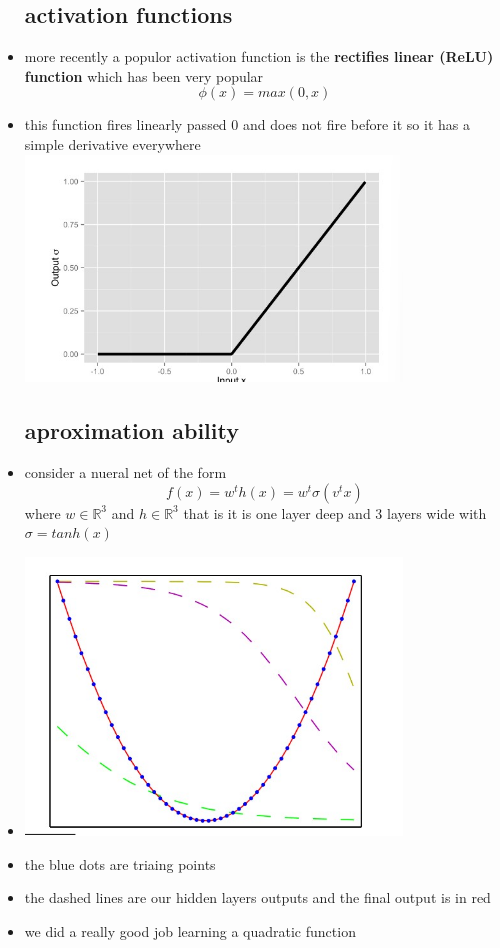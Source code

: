 \documentclass{article}
\begin{document}
\begin{itemize}
\subsection{activation functions }
\item more recently a populor activation function is the \textbf{rectifies linear (ReLU) function } which has been very popular $$\phi(x)=max(0,x)$$
\item this function fires linearly passed 0 and does not fire before it so it has a simple derivative everywhere
\\
\includegraphics[width=10cm]{lecture_notes/lecture_11/immages/l11_6.jpg}
\subsection{aproximation ability}
\item consider a nueral net of the form $$f(x)=w^th(x)=w^t\sigma(v^tx)$$ where $w\in \mathbb{R}^{3}$ and $h\in \mathbb{R}^3$ that is it is one layer deep and 3 layers wide with $\sigma=tanh(x)$
\item \includegraphics[width=10cm]{lecture_notes/lecture_11/immages/l11_7.jpg}
\item the blue dots are triaing points 
\item the dashed lines are our hidden layers outputs and the final output is in red 
\item we did a really good job learning a quadratic function 

\end{itemize}
\end{document}
